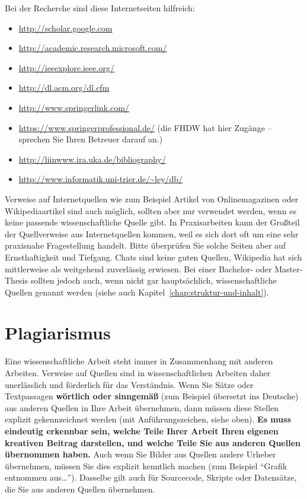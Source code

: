 Bei der Recherche sind diese Internetseiten hilfreich:
\begin{itemize}
  \item \url{http://scholar.google.com}
  \item \url{http://academic.research.microsoft.com/}
  \item \url{http://ieeexplore.ieee.org/}
  \item \url{http://dl.acm.org/dl.cfm}
  \item \url{http://www.springerlink.com/}
  \item \url{https://www.springerprofessional.de/} (die FHDW hat hier Zugänge -- sprechen Sie Ihren Betreuer darauf an.)
  \item \url{http://liinwww.ira.uka.de/bibliography/}
  \item \url{http://www.informatik.uni-trier.de/~ley/db/}
\end{itemize}

Verweise auf Internetquellen wie zum Beispiel Artikel von Onlinemagazinen oder Wikipediaartikel sind auch möglich, sollten aber nur verwendet werden, wenn es keine passende wissenschaftliche Quelle gibt. 
In Praxisarbeiten kann der Großteil der Quellverweise aus Internetquellen kommen, weil es sich dort oft um eine sehr praxisnahe Fragestellung handelt. Bitte überprüfen Sie solche Seiten aber auf Ernsthaftigkeit und Tiefgang. Chats sind keine guten Quellen, Wikipedia hat sich mittlerweise als weitgehend zuverlässig erwiesen. Bei einer Bachelor- oder Master-Thesis sollten jedoch auch, wenn nicht gar hauptsächlich, wissenschaftliche Quellen genannt werden (siehe auch Kapitel~\ref{chap:struktur-und-inhalt}).


\section{Plagiarismus}

Eine wissenschaftliche Arbeit steht immer in Zusammenhang mit anderen Arbeiten. Verweise auf Quellen sind in wissenschaftlichen Arbeiten daher unerlässlich und förderlich für das Verständnis. Wenn Sie Sätze oder Textpassagen \textbf{wörtlich oder sinngemäß} (zum Beispiel übersetzt ins Deutsche) aus anderen Quellen in Ihre Arbeit übernehmen, dann müssen diese Stellen explizit gekennzeichnet werden (mit Anführungszeichen, siehe oben). \textbf{Es muss eindeutig erkennbar sein, welche Teile Ihrer Arbeit Ihren eigenen kreativen Beitrag darstellen, und welche Teile Sie aus anderen Quellen übernommen haben.} Auch wenn Sie Bilder aus Quellen andere Urheber übernehmen, müssen Sie dies explizit kenntlich machen (zum Beispiel \enquote{Grafik entnommen aus\ldots}). Dasselbe gilt auch für Sourcecode, Skripte oder Datensätze, die Sie aus anderen Quellen übernehmen.

